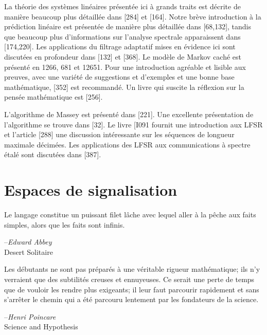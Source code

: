 \documentclass[10pt,twoside,a4paper]{book}
\begin{document}
\noindent
La théorie des systèmes linéaires présentée ici à grands traits est décrite de manière beaucoup plus détaillée dans [284] et [164]. 
Notre brève introduction à la prédiction linéaire est présentée de manière plus détaillée dans [68,132], tandis que beaucoup plus d'informations sur l'analyse spectrale apparaissent dans [174,220]. 
Les applications du filtrage adaptatif mises en évidence ici sont discutées en profondeur dans [132] et [368]. Le modèle de Markov caché est présenté en 1266, 681 et 12651. 
Pour une introduction agréable et lisible aux preuves, avec une variété de suggestions et d'exemples et une bonne base mathématique, [352] est recommandé. Un livre qui suscite la réflexion sur la pensée mathématique est [256].

L'algorithme de Massey est présenté dans [221]. Une excellente présentation de l'algorithme se trouve dans [32]. Le livre [I091 fournit une introduction aux LFSR et l'article [288] une discussion intéressante sur les séquences de longueur maximale décimées. 
Les applications des LFSR aux communications à spectre étalé sont discutées dans [387].

\newpage
\thispagestyle{empty}
\newpage

\setcounter{chapter}{1}
\chapter{Espaces de signalisation}

\thispagestyle{empty}

\renewenvironment{quote}{%
  \item\relax
}
{\endlist}

\begin{quote}
  Le langage constitue un puissant filet lâche avec lequel aller à la pêche aux faits simples, alors que les faits sont infinis.
  \begin{flushright}
  {--\textit{Edward Abbey} \\ Desert Solitaire}
  \end{flushright}
\end{quote}
\begin{quote}
  Les débutants ne sont pas préparés à une véritable rigueur mathématique; ils n'y verraient que des subtilités creuses et ennuyeuses. Ce serait une perte de temps que de vouloir les rendre plus exigeants; il leur faut parcourir rapidement et sans s'arrêter le chemin qui a été parcouru lentement par les fondateurs de la science.
  \begin{flushright}
  {--\textit{Henri Poincare} \\ Science and Hypothesis}
  \end{flushright}
\end{quote}
\vspace{7mm}
\end{document}
